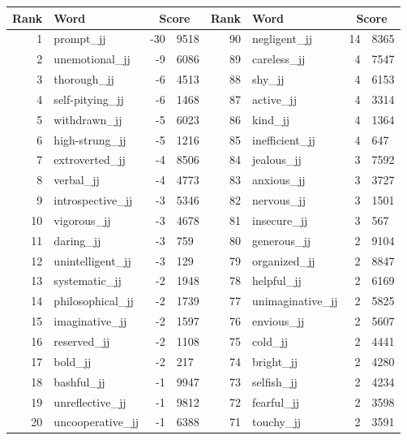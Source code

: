 \begin{table}[tbp]
    \begin{tabular}{| rlr@{.}l | rlr@{.}l |}
    \hline
    \textbf{Rank} & \textbf{Word} & \multicolumn{2}{c|}{\textbf{Score}} & \textbf{Rank} & \textbf{Word} & \multicolumn{2}{c|}{\textbf{Score}} \\
    \hline
    1 & prompt\_jj & -30 & 9518    &    90 & negligent\_jj & 14 & 8365 \\
    2 & unemotional\_jj & -9 & 6086    &    89 & careless\_jj & 4 & 7547 \\
    3 & thorough\_jj & -6 & 4513    &    88 & shy\_jj & 4 & 6153 \\
    4 & self-pitying\_jj & -6 & 1468    &    87 & active\_jj & 4 & 3314 \\
    5 & withdrawn\_jj & -5 & 6023    &    86 & kind\_jj & 4 & 1364 \\
    6 & high-strung\_jj & -5 & 1216    &    85 & inefficient\_jj & 4 & 647 \\
    7 & extroverted\_jj & -4 & 8506    &    84 & jealous\_jj & 3 & 7592 \\
    8 & verbal\_jj & -4 & 4773    &    83 & anxious\_jj & 3 & 3727 \\
    9 & introspective\_jj & -3 & 5346    &    82 & nervous\_jj & 3 & 1501 \\
    10 & vigorous\_jj & -3 & 4678    &    81 & insecure\_jj & 3 & 567 \\
    11 & daring\_jj & -3 & 759    &    80 & generous\_jj & 2 & 9104 \\
    12 & unintelligent\_jj & -3 & 129    &    79 & organized\_jj & 2 & 8847 \\
    13 & systematic\_jj & -2 & 1948    &    78 & helpful\_jj & 2 & 6169 \\
    14 & philosophical\_jj & -2 & 1739    &    77 & unimaginative\_jj & 2 & 5825 \\
    15 & imaginative\_jj & -2 & 1597    &    76 & envious\_jj & 2 & 5607 \\
    16 & reserved\_jj & -2 & 1108    &    75 & cold\_jj & 2 & 4441 \\
    17 & bold\_jj & -2 & 217    &    74 & bright\_jj & 2 & 4280 \\
    18 & bashful\_jj & -1 & 9947    &    73 & selfish\_jj & 2 & 4234 \\
    19 & unreflective\_jj & -1 & 9812    &    72 & fearful\_jj & 2 & 3598 \\
    20 & uncooperative\_jj & -1 & 6388    &    71 & touchy\_jj & 2 & 3591 \\

\end{tabular}
\end{table}
